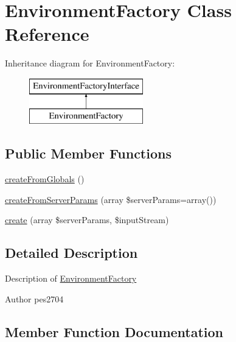 \hypertarget{class_pes_1_1_http_1_1_factory_1_1_environment_factory}{}\section{Environment\+Factory Class Reference}
\label{class_pes_1_1_http_1_1_factory_1_1_environment_factory}
Inheritance diagram for Environment\+Factory\+:\begin{figure}[H]
\begin{center}
\leavevmode
\includegraphics[height=2.000000cm]{class_pes_1_1_http_1_1_factory_1_1_environment_factory}
\end{center}
\end{figure}
\subsection*{Public Member Functions}
\begin{DoxyCompactItemize}
\item 
\mbox{\hyperlink{class_pes_1_1_http_1_1_factory_1_1_environment_factory_a0c9fd6ecd2d19d53bdbaa89c08428564}{create\+From\+Globals}} ()
\item 
\mbox{\hyperlink{class_pes_1_1_http_1_1_factory_1_1_environment_factory_aaf064f4cfd8fa6ba2e87755aa7f03b26}{create\+From\+Server\+Params}} (array \$server\+Params=array())
\item 
\mbox{\hyperlink{class_pes_1_1_http_1_1_factory_1_1_environment_factory_a33804929de8d2b0b9d198957b8ffaf0a}{create}} (array \$server\+Params, \$input\+Stream)
\end{DoxyCompactItemize}


\subsection{Detailed Description}
Description of \mbox{\hyperlink{class_pes_1_1_http_1_1_factory_1_1_environment_factory}{Environment\+Factory}}

\begin{DoxyAuthor}{Author}
pes2704 
\end{DoxyAuthor}


\subsection{Member Function Documentation}
\mbox{\label{class_pes_1_1_http_1_1_factory_1_1_environment_factory_a33804929de8d2b0b9d198957b8ffaf0a}} 
